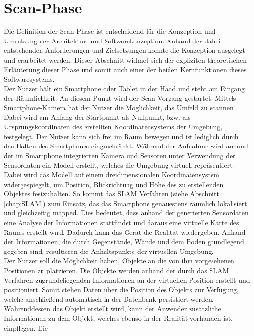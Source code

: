 \section{Scan-Phase}
\label{chap:Scan-Phase} %
Die Definition der Scan-Phase ist entscheidend für die Konzeption und Umsetzung der Architektur- und Softwarekonzeption. 
Anhand der dabei entstehenden Anforderungen und Zielsetzungen konnte die Konzeption ausgelegt und erarbeitet werden. Dieser Abschnitt widmet 
sich der expliziten theoretischen Erläuterung dieser Phase und somit auch einer der beiden Kernfunktionen dieses Softwaresystems.
\\ 
\linebreak
Der Nutzer hält ein Smartphone oder Tablet in der Hand und steht am Eingang der Räumlichkeit. An diesem Punkt wird der Scan-Vorgang gestartet. 
Mittels Smartphone-Kamera hat der Nutzer die Möglichkeit, das Umfeld zu scannen. Dabei wird am Anfang der Startpunkt als Nullpunkt, bzw. 
als Ursprungskoordinaten des erstellten Koordinatensystems der Umgebung, festgelegt. Der Nutzer kann sich frei im Raum bewegen und ist lediglich 
durch das Halten des Smartphones eingeschränkt. Während der Aufnahme wird anhand der im Smartphone integrierten Kamera und 
Sensoren unter Verwendung der Sensordaten ein Modell erstellt, welches die Umgebung virtuell repräsentiert. Dabei wird das Modell auf 
einem dreidimensionalen Koordinatensystem widergespiegelt, um Position, Blickrichtung und Höhe des zu erstellenden Objektes festzuhalten. 
So kommt das \acl{SLAM} Verfahren (siehe Abschnitt \ref{chap:SLAM}) zum Einsatz, das das Smartphone genauestens räumlich lokalisiert und 
gleichzeitig mapped. Dies bedeutet, dass anhand der generierten Sensordaten eine Analyse der Informationen stattfindet und daraus eine 
virtuelle Karte des Raums erstellt wird. Dadurch kann das Gerät die Realität wiedergeben. Anhand der Informationen, die durch
Gegenstände, Wände und dem Boden grundlegend gegeben sind, resultieren die Anhaltspunkte der virtuellen Umgebung. 
\\ 
\linebreak
Der Nutzer soll die Möglichkeit haben, Objekte an die von ihm vorgesehenen Positionen zu platzieren. Die Objekte werden anhand der durch das 
\acs{SLAM} Verfahren zugrundeliegenden Informationen an der virtuellen Position erstellt und positioniert. Somit 
stehen Daten über die Position des Objekts zur Verfügung, welche anschließend automatisch in der Datenbank persistiert werden. Währenddessen das Objekt 
erstellt wird, kann der Anwender zusätzliche Informationen zu dem Objekt, welches ebenso in der Realität vorhanden ist, einpflegen. Die 
